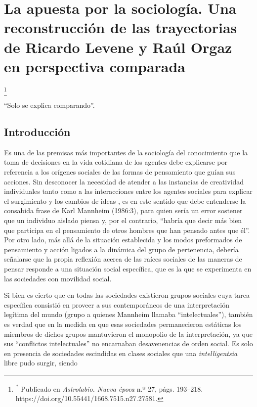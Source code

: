 \mainmatter

\chapter{La apuesta por la sociología. Una reconstrucción de las trayectorias de Ricardo Levene y Raúl Orgaz en perspectiva comparada}

\footnote{\textsuperscript{*} Publicado en \emph{Astrolabio. Nueva época} n.º 27, págs. 193--218. https://doi.org/10.55441/1668.7515.n27.27581.}

\epigraph{\enquote{Solo se explica comparando}.}{\textcite{1617-DURKHEIM2006}}

\section{Introducción}

Es una de las premisas más importantes de la sociología del conocimiento que la toma de decisiones en la vida cotidiana de los agentes debe explicarse por referencia a los orígenes sociales de las formas de pensamiento que guían sus acciones. Sin desconocer la necesidad de atender a las instancias de creatividad individuales tanto como a las interacciones entre los agentes sociales para explicar el surgimiento y los cambios de ideas \parencite{1527-SALES2007}, es en este sentido que debe entenderse la consabida frase de Karl Mannheim (1986:3), para quien sería un error sostener que un individuo aislado piensa y, por el contrario, \enquote{habría que decir más bien que participa en el pensamiento de otros hombres que han pensado antes que él}. Por otro lado, más allá de la situación establecida y los modos preformados de pensamiento y acción ligados a la dinámica del grupo de pertenencia, debería señalarse que la propia reflexión acerca de las raíces sociales de las maneras de pensar responde a una situación social específica, que es la que se experimenta en las sociedades con movilidad social.

Si bien es cierto que en todas las sociedades existieron grupos sociales cuya tarea específica consistió en proveer a sus contemporáneos de una interpretación legítima del mundo (grupo a quienes Mannheim llamaba \enquote{intelectuales}), también es verdad que en la medida en que esas sociedades permanecieron estáticas los miembros de dichos grupos mantuvieron el monopolio de la interpretación, ya que sus \enquote{conflictos intelectuales} no encarnaban desavenencias de orden social. Es solo en presencia de sociedades escindidas en clases sociales que una \emph{intelligentsia} libre pudo surgir, siendo

